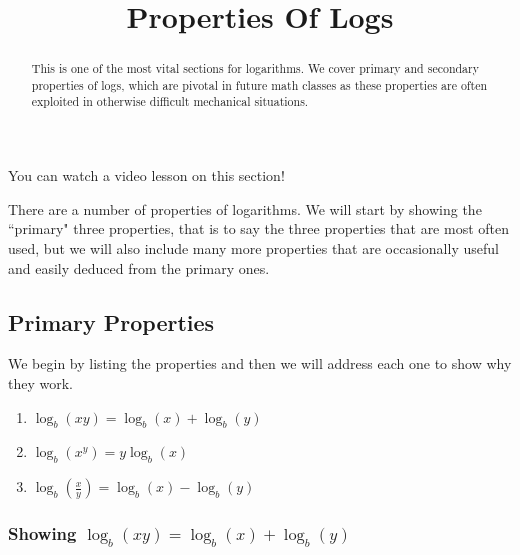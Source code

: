 \documentclass{ximeraXloud}
\title{Properties Of Logs}
\begin{document}
\begin{abstract}
    This is one of the most vital sections for logarithms. We cover primary and secondary properties of logs, which are pivotal in future math classes as these properties are often exploited in otherwise difficult mechanical situations.
\end{abstract}
\maketitle

You can watch a video lesson on this section!


There are a number of properties of logarithms. We will start by showing the ``primary" three properties, that is to say the three properties that are most often used, but we will also include many more properties that are occasionally useful and easily deduced from the primary ones.

\subsection*{Primary Properties}
    
    We begin by listing the properties and then we will address each one to show why they work.
    
    \begin{enumerate}
        \item $\log_b(xy) = \log_b(x) + \log_b(y)$
        \item $\log_b(x^y) = y\log_b(x)$
        \item $\log_b\left(\frac{x}{y}\right) = \log_b(x) - \log_b(y)$
    \end{enumerate}
    
    \subsubsection*{Showing $\log_b(xy) = \log_b(x) + \log_b(y)$}
        
\end{document}
